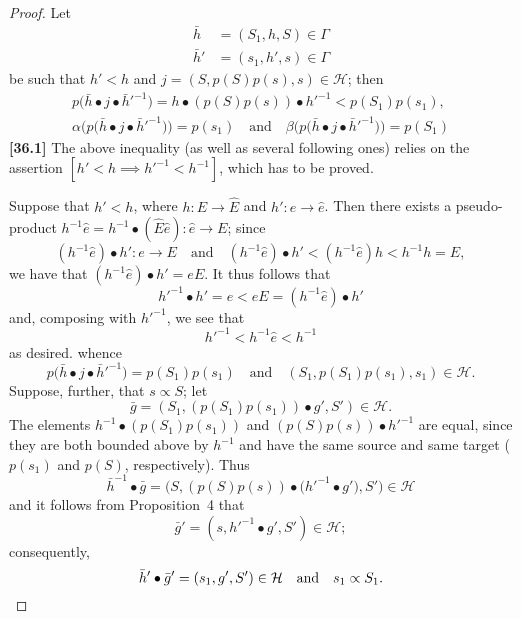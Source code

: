 \documentclass[a4paper,fleqn]{article}
\theoremstyle{plain}
\theoremstyle{definition}
\newenvironment{longcomm}[1]
  {\noindent\textbf{[#1]}\rmfamily}
  {}
\newcommand{\oldpage}[1]{{\marginpar{\footnotesize$\bigg\vert$\,\,\,\,\textit{p.~#1}}}}
\newcommand{\textand}{\quad\text{and}\quad}
\newcommand{\HH}{\mathcal{H}}
\newcommand{\subs}{\mathrel{\propto}}
\begin{document}
\begin{proof}
  \oldpage{364}
  Let
  \[
    \begin{aligned}
      \bar{h}
      &= (S_1,h,S)\in\Gamma
    \\\bar{h}'
      &= (s_1,h',s)\in\Gamma
    \end{aligned}
  \]
  be such that $h'<h$ and $j=(S,p(S)p(s),s)\in\HH$;
  then
  \[
    \begin{gathered}
      p\big(\bar{h}\bullet j\bullet \bar{h}'^{-1}\big)
      = h\bullet(p(S)p(s))\bullet h'^{-1}
      < p(S_1)p(s_1),
    \\\alpha\big(p\big(\bar{h}\bullet j\bullet\bar{h}'^{-1}\big)\big)
      = p(s_1)
      \textand
      \beta\big(p\big(\bar{h}\bullet j\bullet\bar{h}'^{-1}\big)\big)
      = p(S_1)
    \end{gathered}
  \]
  \begin{longcomm}{36.1}
    The above inequality (as well as several following ones) relies on the assertion $[h'<h\implies {h'}^{-1}<h^{-1}]$, which has to be proved.

    Suppose that $h'<h$, where $h\colon E\to\hat{E}$ and $h'\colon e\to\hat{e}$.
    Then there exists a pseudo-product $h^{-1}\hat{e}=h^{-1}\bullet(\hat{E}\hat{e})\colon\hat{e}\to E$;
    since
    \[
      (h^{-1}\hat{e})\bullet h'\colon e\to E
      \textand
      (h^{-1}\hat{e})\bullet h'
      < (h^{-1}\hat{e})h
      < h^{-1}h
      = E,
    \]
    we have that $(h^{-1}\hat{e})\bullet h'=eE$.
    It thus follows that
    \[
      {h'}^{-1}\bullet h'
      = e
      < eE
      = (h^{-1}\hat{e})\bullet h'
    \]
    and, composing with ${h'}^{-1}$, we see that
    \[
      {h'}^{-1}
      < h^{-1}\hat{e}
      < h^{-1}
    \]
    as desired.
  \end{longcomm}
  whence
  \[
    p\big(\bar{h}\bullet j\bullet\bar{h}'^{-1}\big)
    = p(S_1)p(s_1)
    \textand
    (S_1,p(S_1)p(s_1),s_1)
    \in\HH.
  \]
  Suppose, further, that $s\subs S$;
  let
  \[
    \bar{g}
    = (S_1,(p(S_1)p(s_1))\bullet g',S')
    \in\HH.
  \]
  The elements $h^{-1}\bullet(p(S_1)p(s_1))$ and $(p(S)p(s))\bullet h'^{-1}$ are equal, since they are both bounded above by $h^{-1}$ and have the same source and same target ($p(s_1)$ and $p(S)$, respectively).
  Thus
  \[
    \bar{h}^{-1}\bullet\bar{g}
    = \big(S,(p(S)p(s))\bullet\big( h'^{-1}\bullet g'\big),S'\big)
    \in\HH
  \]
  and it follows from Proposition~4 that
  \[
    \bar{g}'
    = (s,h'^{-1}\bullet g',S')
    \in\HH;
  \]
  consequently,
  \[
    \bar{h}'\bullet\bar{g}'
    = (s_1,g',S')
    \in\HH
    \textand
    s_1\subs S_1.
    \qedhere
  \]
\end{proof}
\end{document}
